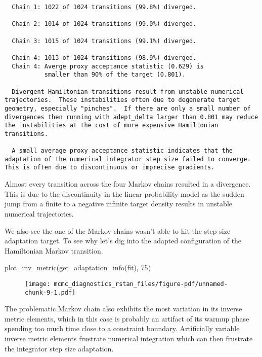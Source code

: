 \documentclass[
  letterpaper,
  DIV=11,
  numbers=noendperiod]{scrartcl}
\newenvironment{Shaded}{\begin{snugshade}}{\end{snugshade}}
\newcommand{\DecValTok}[1]{\textcolor[rgb]{0.68,0.00,0.00}{#1}}
\newcommand{\FunctionTok}[1]{\textcolor[rgb]{0.28,0.35,0.67}{#1}}
\newcommand{\NormalTok}[1]{\textcolor[rgb]{0.00,0.23,0.31}{#1}}
\begin{document}
\begin{verbatim}
  Chain 1: 1022 of 1024 transitions (99.8%) diverged.

  Chain 2: 1014 of 1024 transitions (99.0%) diverged.

  Chain 3: 1015 of 1024 transitions (99.1%) diverged.

  Chain 4: 1013 of 1024 transitions (98.9%) diverged.
  Chain 4: Averge proxy acceptance statistic (0.629) is
           smaller than 90% of the target (0.801).

  Divergent Hamiltonian transitions result from unstable numerical
trajectories.  These instabilities often due to degenerate target
geometry, especially "pinches".  If there are only a small number of
divergences then running with adept_delta larger than 0.801 may reduce
the instabilities at the cost of more expensive Hamiltonian
transitions.

  A small average proxy acceptance statistic indicates that the
adaptation of the numerical integrator step size failed to converge.
This is often due to discontinuous or imprecise gradients.
\end{verbatim}

Almost every transition across the four Markov chains resulted in a
divergence. This is due to the discontinuity in the linear probability
model as the sudden jump from a finite to a negative infinite target
density results in unstable numerical trajectories.

We also see the one of the Markov chains wasn't able to hit the step
size adaptation target. To see why let's dig into the adapted
configuration of the Hamiltonian Markov transition.

\begin{Shaded}
\begin{Highlighting}[]
\FunctionTok{plot\_inv\_metric}\NormalTok{(}\FunctionTok{get\_adaptation\_info}\NormalTok{(fit), }\DecValTok{75}\NormalTok{)}
\end{Highlighting}
\end{Shaded}

\begin{figure}[H]

{\centering \texttt{[image: mcmc\_diagnostics\_rstan\_files/figure-pdf/unnamed-chunk-9-1.pdf]}

}

\end{figure}

The problematic Markov chain also exhibits the most variation in its
inverse metric elements, which in this case is probably an artifact of
its warmup phase spending too much time close to a constraint boundary.
Artificially variable inverse metric elements frustrate numerical
integration which can then frustrate the integrator step size
adaptation.
\end{document}
